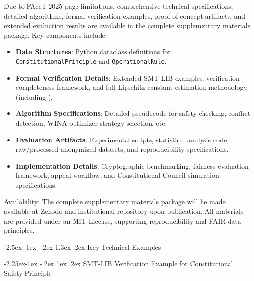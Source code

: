 \documentclass[manuscript,screen,9pt]{acmart}
\makeatletter
\renewcommand\section{\@startsection{section}{1}{\z@}%
  {-2.5ex \@plus -1ex \@minus -.2ex}%
  {1.3ex \@plus.2ex}%
  {\normalfont\Large\bfseries}}
\renewcommand\subsection{\@startsection{subsection}{2}{\z@}%
  {-2.25ex\@plus -1ex \@minus -.2ex}%
  {1ex \@plus .2ex}%
  {\normalfont\large\bfseries}}
\makeatother
\begin{document}
Due to FAccT 2025 page limitations, comprehensive technical specifications, detailed algorithms, formal verification examples, proof-of-concept artifacts, and extended evaluation results are available in the complete supplementary materials package. Key components include:
\begin{itemize}[leftmargin=*,itemsep=1pt,parsep=1pt]
	\item \textbf{Data Structures}: Python dataclass definitions for \texttt{ConstitutionalPrinciple} and \texttt{OperationalRule}.
	\item \textbf{Formal Verification Details}: Extended SMT-LIB examples, verification completeness framework, and full Lipschitz constant estimation methodology (including ).
	\item \textbf{Algorithm Specifications}: Detailed pseudocode for safety checking, conflict detection, WINA-optimizer strategy selection, etc.
	\item \textbf{Evaluation Artifacts}: Experimental scripts, statistical analysis code, raw/processed anonymized datasets, and reproducibility specifications.
	\item \textbf{Implementation Details}: Cryptographic benchmarking, fairness evaluation framework, appeal workflow, and Constitutional Council simulation specifications.
\end{itemize}
Availability: The complete supplementary materials package will be made available at Zenodo and institutional repository upon publication. All materials are provided under an MIT License, supporting reproducibility and FAIR data principles.

\section{Key Technical Examples}
\label{app:key_examples}

\subsection{SMT-LIB Verification Example for Constitutional Safety Principle}
\label{subsubsec:smtlib_verification_example}
\end{document}
